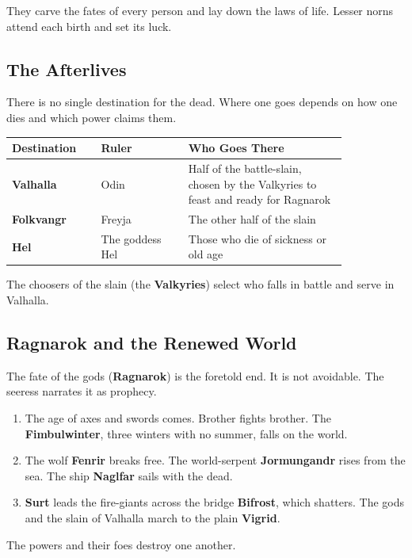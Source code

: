 They carve the fates of every person and lay down the laws of life. Lesser norns attend each birth and set its luck.

\subsection{The Afterlives}

There is no single destination for the dead. Where one goes depends on how one dies and which power claims them.

\begin{longtable}{L{0.22\linewidth}
L{0.22\linewidth} L{0.4\linewidth}}
\toprule
\textbf{Destination} & \textbf{Ruler} & \textbf{Who Goes There} \\
\midrule
\textbf{Valhalla} & Odin & Half of the battle-slain, chosen by the Valkyries to feast and ready for Ragnarok \\
\textbf{Folkvangr} & Freyja & The other half of the slain \\
\textbf{Hel} & The goddess Hel & Those who die of sickness or old age \\
\bottomrule
\end{longtable}

The choosers of the slain (the \textbf{Valkyries}) select who falls in battle and serve in Valhalla.

\subsection{Ragnarok and the Renewed World}

The fate of the gods (\textbf{Ragnarok}) is the foretold end. It is not avoidable. The seeress narrates it as prophecy.

\begin{enumerate}
 \item The age of axes and swords comes. Brother fights brother. The \textbf{Fimbulwinter}, three winters with no summer, falls on the world.
 \item The wolf \textbf{Fenrir} breaks free. The world-serpent \textbf{Jormungandr} rises from the sea. The ship \textbf{Naglfar} sails with the dead.
 \item \textbf{Surt} leads the fire-giants across the bridge \textbf{Bifrost}, which shatters. The gods and the slain of Valhalla march to the plain \textbf{Vigrid}.
\end{enumerate}

The powers and their foes destroy one another.

